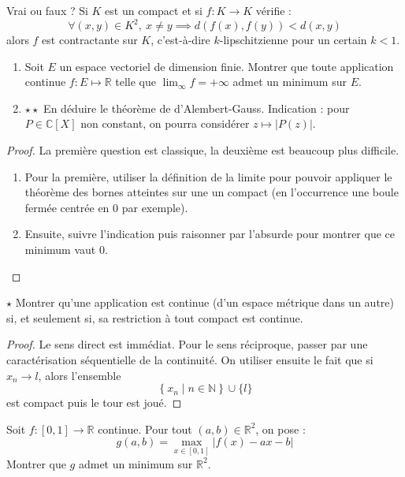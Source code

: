 \documentclass[french,a4paper]{article}
\newcommand{\N}{\mathbb{N}}
\newcommand{\R}{\mathbb{R}}
\newcommand{\C}{\mathbb{C}}
\theoremstyle{plain}
\theoremstyle{definition}
\theoremstyle{remark}
\begin{document}
\begin{ex}{}
	Vrai ou faux ? Si $K$ est un compact et si $f:K\to K$ vérifie : $$\forall (x,y)\in K^2,\ x\ne y\implies d(f(x),f(y))<d(x,y)$$ alors $f$ est contractante sur $K$, c'est-à-dire $k$-lipschitzienne pour un certain $k<1$.
\end{ex}

\begin{ex}{}
	\begin{enumerate}
		\item Soit $E$ un espace vectoriel de dimension finie. Montrer que toute application continue $f:E\mapsto\R$ telle que $\displaystyle\lim_{\infty}f=+\infty$ admet un minimum sur $E$.
		\item $\star\star$ En déduire le théorème de d'Alembert-Gauss. Indication : pour $P\in\C[X]$ non constant, on pourra considérer $z\mapsto\lvert P(z)\rvert$.
	\end{enumerate}
\end{ex}
\begin{proof}
	La première question est classique, la deuxième est beaucoup plus difficile.
	\begin{enumerate}
		\item Pour la première, utiliser la définition de la limite pour pouvoir appliquer le théorème des bornes atteintes sur une un compact (en l'occurrence une boule fermée centrée en $0$ par exemple).
		\item Ensuite, suivre l'indication puis raisonner par l'absurde pour montrer que ce minimum vaut $0$.
	\end{enumerate}
\end{proof}

\begin{ex}{$\star$}
	Montrer qu'une application est continue (d'un espace métrique dans un autre) si, et seulement si, sa restriction à tout compact est continue.
\end{ex}
\begin{proof}
	Le sens direct est immédiat. Pour le sens réciproque, passer par une caractérisation séquentielle de la continuité. On utiliser ensuite le fait que si $x_n\to l$, alors l'ensemble $$\left\{x_n\mid n\in\N\right\}\cup\{l\}$$ est compact puis le tour est joué.
\end{proof}

\begin{ex}{}
	Soit $f:[0,1]\to\R$ continue. Pour tout $(a,b)\in\R^2$, on pose : $$g(a,b)=\underset{x\in[0,1]}{\max}\lvert f(x)-ax-b\rvert$$ Montrer que $g$ admet un minimum sur $\R^2$.
\end{ex}
\end{document}
